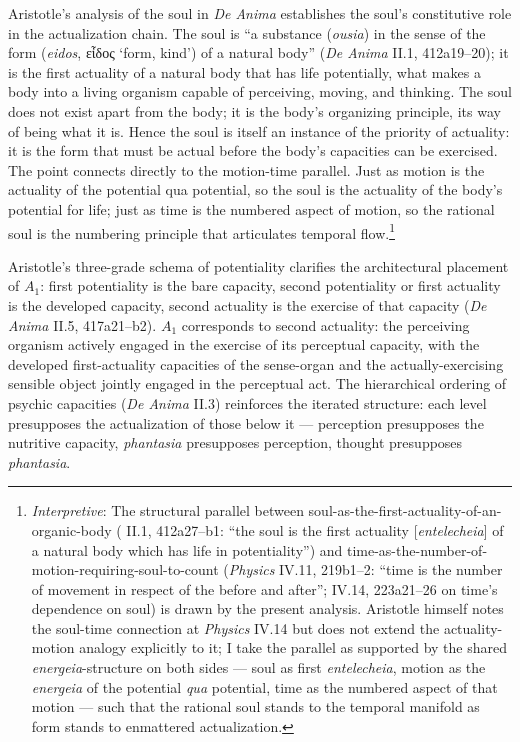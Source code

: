 \documentclass{article}
\newcommand{\gk}[1]{{\greekfont #1}}
\begin{document}
Aristotle's analysis of the soul in \textit{De Anima} establishes the soul's constitutive role in the actualization chain. The soul is ``a substance (\textit{ousia}) in the sense of the form (\textit{eidos}, \gk{εἶδος} `form, kind') of a natural body'' (\textit{De Anima} II.1, 412a19--20); it is the first actuality of a natural body that has life potentially, what makes a body into a living organism capable of perceiving, moving, and thinking. The soul does not exist apart from the body; it is the body's organizing principle, its way of being what it is. Hence the soul is itself an instance of the priority of actuality: it is the form that must be actual before the body's capacities can be exercised. The point connects directly to the motion-time parallel. Just as motion is the actuality of the potential qua potential, so the soul is the actuality of the body's potential for life; just as time is the numbered aspect of motion, so the rational soul is the numbering principle that articulates temporal flow.\footnote{\textit{Interpretive}: The structural parallel between soul-as-the-first-actuality-of-an-organic-body (\cite{aristotle2014soul} II.1, 412a27--b1: ``the soul is the first actuality [\textit{entelecheia}] of a natural body which has life in potentiality'') and time-as-the-number-of-motion-requiring-soul-to-count (\textit{Physics} IV.11, 219b1--2: ``time is the number of movement in respect of the before and after''; IV.14, 223a21--26 on time's dependence on soul) is drawn by the present analysis. Aristotle himself notes the soul-time connection at \textit{Physics} IV.14 but does not extend the actuality-motion analogy explicitly to it; I take the parallel as supported by the shared \textit{energeia}-structure on both sides --- soul as first \textit{entelecheia}, motion as the \textit{energeia} of the potential \textit{qua} potential, time as the numbered aspect of that motion --- such that the rational soul stands to the temporal manifold as form stands to enmattered actualization.}

Aristotle's three-grade schema of potentiality clarifies the architectural placement of $A_1$: first potentiality is the bare capacity, second potentiality or first actuality is the developed capacity, second actuality is the exercise of that capacity (\textit{De Anima} II.5, 417a21--b2). $A_1$ corresponds to second actuality: the perceiving organism actively engaged in the exercise of its perceptual capacity, with the developed first-actuality capacities of the sense-organ and the actually-exercising sensible object jointly engaged in the perceptual act. The hierarchical ordering of psychic capacities (\textit{De Anima} II.3) reinforces the iterated structure: each level presupposes the actualization of those below it --- perception presupposes the nutritive capacity, \textit{phantasia} presupposes perception, thought presupposes \textit{phantasia}.
\end{document}
